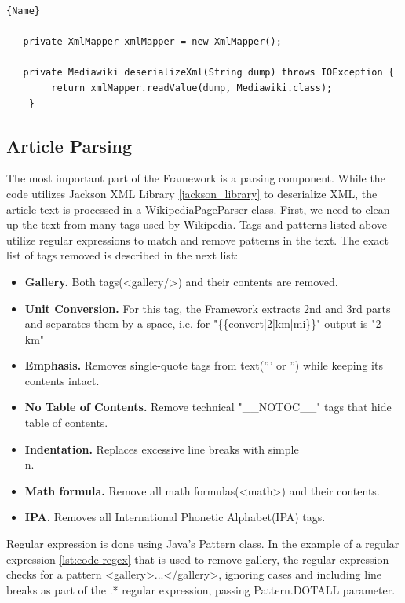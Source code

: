 \documentclass[thesis=M,english,hidelinks]{FITthesis}[2019/12/23]
\begin{document}
\begin{lstlisting}[caption=Example of an XML Deserialization,frame=tlrb,  label = {lst:xml-deserialization}]{Name}
   
   private XmlMapper xmlMapper = new XmlMapper();
   
   private Mediawiki deserializeXml(String dump) throws IOException {
		return xmlMapper.readValue(dump, Mediawiki.class);
	}

\end{lstlisting}

\subsection{Article Parsing}\label{article_parsing}

The most important part of the Framework is a parsing component. While the code utilizes Jackson XML Library \ref{jackson_library} to deserialize XML, the article text is processed in a WikipediaPageParser class. First, we need to clean up the text from many tags used by Wikipedia\cite{Wikipedia_Template}.  Tags and patterns listed above utilize regular expressions to match and remove patterns in the text. The exact list of tags removed is described in the next list:

\begin{itemize}
	\item \textbf{Gallery.} Both tags(<gallery/>) and their contents are removed. 
	\item \textbf{Unit Conversion.}  For this tag, the Framework extracts 2nd and 3rd parts and separates them by a space, i.e. for "\{\{convert|2|km|mi\}\}" output is "2 km"
	\item \textbf{Emphasis.} Removes single-quote tags from text(''' or '') while keeping its contents intact.
	\item \textbf{No Table of Contents.} Remove technical "\_\_NOTOC\_\_" tags that hide table of contents.
	\item \textbf{Indentation.} Replaces excessive line breaks with simple \\n.
	\item \textbf{Math formula.} Remove all math formulas(<math>) and their contents.
	\item \textbf{IPA.} Removes all International Phonetic Alphabet(IPA) tags.
\end{itemize}

Regular expression is done using Java's Pattern class. In the example of a regular expression \ref{lst:code-regex} that is used  to remove gallery, the regular expression checks for a pattern <gallery>...</gallery>, ignoring cases and including line breaks as part of the .* regular expression, passing Pattern.DOTALL parameter.
\end{document}
